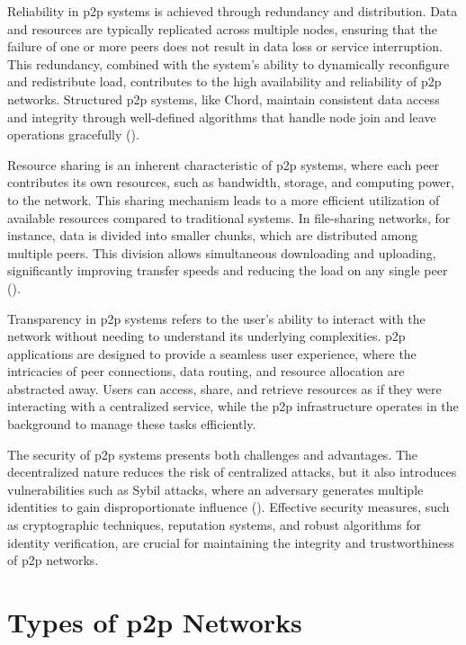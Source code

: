 Reliability in \gls{p2p} systems is achieved through redundancy and distribution.
Data and resources are typically replicated across multiple nodes, ensuring that the failure of one or more peers does not result in data loss or service interruption.
This redundancy, combined with the system's ability to dynamically reconfigure and redistribute load, contributes to the high availability and reliability of \gls{p2p} networks.
Structured \gls{p2p} systems, like Chord, maintain consistent data access and integrity through well-defined algorithms that handle node join and leave operations gracefully (\cite{stoica2001,zarrin2017}).

Resource sharing is an inherent characteristic of \gls{p2p} systems, where each peer contributes its own resources, such as bandwidth, storage, and computing power, to the network.
This sharing mechanism leads to a more efficient utilization of available resources compared to traditional systems.
In file-sharing networks, for instance, data is divided into smaller chunks, which are distributed among multiple peers.
This division allows simultaneous downloading and uploading, significantly improving transfer speeds and reducing the load on any single peer (\cite{cohen2003incentives}).

Transparency in \gls{p2p} systems refers to the user's ability to interact with the network without needing to understand its underlying complexities.
\gls{p2p} applications are designed to provide a seamless user experience, where the intricacies of peer connections, data routing, and resource allocation are abstracted away.
Users can access, share, and retrieve resources as if they were interacting with a centralized service, while the \gls{p2p} infrastructure operates in the background to manage these tasks efficiently.

The security of \gls{p2p} systems presents both challenges and advantages.
The decentralized nature reduces the risk of centralized attacks, but it also introduces vulnerabilities such as Sybil attacks, where an adversary generates multiple identities to gain disproportionate influence (\cite{Douceur2002}).
Effective security measures, such as cryptographic techniques, reputation systems, and robust algorithms for identity verification, are crucial for maintaining the integrity and trustworthiness of \gls{p2p} networks.

\section{Types of \gls{p2p} Networks}

